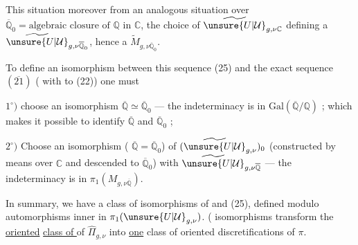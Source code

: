 This situation moreover   from an analogous situation over $\overline{\mathbb Q}_0=\text{algebraic closure of }\mathbb Q\text{ in }\mathbb C$, the choice of $\widetilde{\unsure{U|\mathcal{U}}}_{g,\nu\mathbb C}$ defining a $\widetilde{\unsure{U|\mathcal{U}}}_{g,\nu\overline{\mathbb Q}_0}$, hence a $\widetilde{M}_{g,\nu\overline{\mathbb Q}_0}$.

To define an isomorphism between this sequence (25) and the exact sequence $(\overline{21})$  ( with  to (22)) one must

$1^{\circ})$ choose an isomorphism $\overline{\mathbb Q}\simeq\overline{\mathbb Q}_0$ --- the indeterminacy is in $\mathrm{Gal}(\overline{\mathbb Q}/\mathbb Q)$ ; which makes it possible to identify $\overline{\mathbb Q}$ and $\overline{\mathbb Q}_0$ ;

$2^{\circ})$ Choose an isomorphism ( $\overline{\mathbb Q}=\overline{\mathbb Q}_0$) of $(\widetilde{\unsure{U|\mathcal{U}}}_{g,\nu})_0$ (constructed by  means over $\mathbb C$ and descended to $\overline{\mathbb Q}_0$) with $\widetilde{\unsure{U|\mathcal{U}}}_{g,\nu\overline{\mathbb Q}}$ --- the indeterminacy is in $\pi_1(M_{g,\nu\overline{\mathbb Q}})$.

In summary, we have a class of isomorphisms of  and (25), defined modulo automorphisms  inner in  $\pi_1(\unsure{U|\mathcal{U}}_{g,\nu})$. (  isomorphisms transform the   \uline{oriented} \uline{class of } of $\widehat{\Pi}_{g,\nu}$ into   \uline{one} class of oriented discretifications of $\pi$.




